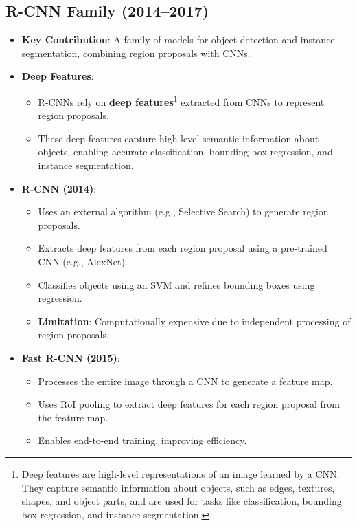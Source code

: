 \begin{notechapter}
\section{R-CNN Family (2014--2017)}
\begin{itemize}
  \item \textbf{Key Contribution}: A family of models for object 
    detection and instance segmentation, combining region proposals 
    with CNNs.
  \item \textbf{Deep Features}:
    \begin{itemize}
      \item R-CNNs rely on \textbf{deep features}\footnote{Deep 
        features are high-level representations of an image learned by 
        a CNN. They capture semantic information about objects, such as 
        edges, textures, shapes, and object parts, and are used for 
        tasks like classification, bounding box regression, and 
        instance segmentation.} extracted from CNNs to represent 
        region proposals.
      \item These deep features capture high-level semantic information 
        about objects, enabling accurate classification, bounding box 
        regression, and instance segmentation.
    \end{itemize}
  \item \textbf{R-CNN (2014)}:
    \begin{itemize}
      \item Uses an external algorithm (e.g., Selective Search) to 
        generate region proposals.
      \item Extracts deep features from each region proposal using a 
        pre-trained CNN (e.g., AlexNet).
      \item Classifies objects using an SVM and refines bounding boxes 
        using regression.
      \item \textbf{Limitation}: Computationally expensive due to 
        independent processing of region proposals.
    \end{itemize}
  \item \textbf{Fast R-CNN (2015)}:
    \begin{itemize}
      \item Processes the entire image through a CNN to generate a 
        feature map.
      \item Uses RoI pooling to extract deep features for each region 
        proposal from the feature map.
      \item Enables end-to-end training, improving efficiency.

\end{itemize}
\end{itemize}
\end{notechapter}
